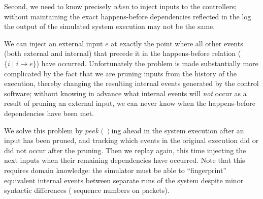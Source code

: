 {Second, we need to know precisely {\em when} to inject inputs to the controllers;
without maintaining the exact happens-before dependencies reflected in the
log the output of the simulated system execution may not be the same.

We can inject an external input $e$ at exactly the point where all other
events (both external and internal) that precede it in the happens-before
relation ($\{i \mid i \rightarrow e\}$) have occurred. Unfortunately the problem is made
substantially more complicated by the fact that we are pruning inputs from the
history of the execution,
thereby changing the resulting internal events generated by the control
software; without knowing in advance what internal events will {\em not} occur
as a result of pruning an external input, we can never know when the happens-before
dependencies have been met.

We solve this problem by $peek()$ing ahead in the system execution after an
input has been pruned, and tracking which events in the original execution did
or did not occur after the pruning. Then we replay again, this time injecting
the next inputs when their remaining dependencies have occurred. Note that
this requires domain knowledge: the simulator must be able to ``fingerprint''
equivalent internal events between separate runs of
the system despite minor
syntactic differences (\eg{} sequence numbers on packets).


\eat{

%
%
%
%
%
%



}}

